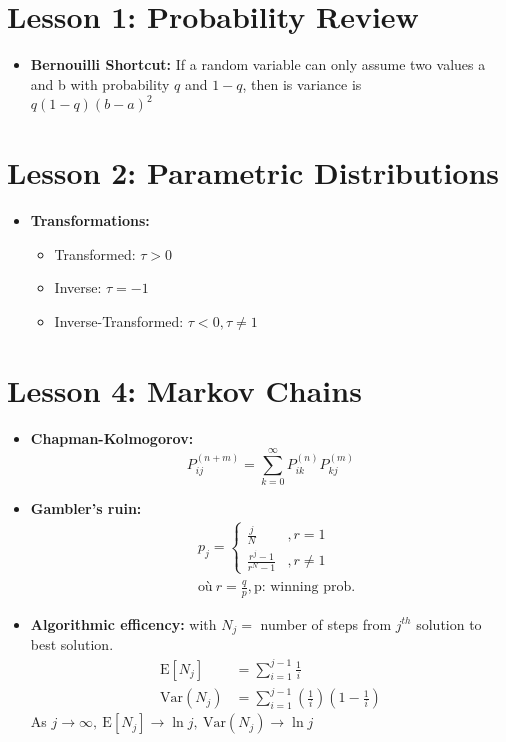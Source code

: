\documentclass[10pt, french]{article}
\begin{document}
\small
\begin{multicols*}{3} %
\def\SectionColor{magenta!80!white}
\section*{Lesson 1: Probability Review}
\begin{itemize}[align=left,leftmargin=*]
    \item \textbf{Bernouilli Shortcut:} If a random variable can only assume two values a and b with probability $q$ and $1-q$, then is variance is \\ $q(1-q)(b-a)^2$
\end{itemize}

\section*{Lesson 2: Parametric Distributions}
\begin{itemize}[align=left,leftmargin=*]
    \item \textbf{Transformations:}
    \begin{itemize}
        \item Transformed: $\tau > 0$
        \item Inverse: $\tau = -1$
        \item Inverse-Transformed: $\tau < 0, \tau \neq 1$
    \end{itemize}
\end{itemize}

\def\SectionColor{brown!80!white}
\section*{Lesson 4: Markov Chains}
\begin{itemize}[align=left,leftmargin=*]
    \item \textbf{Chapman-Kolmogorov:} \[ P_{ij}^{(n+m)} = \sum_{k=0}^\infty P_{ik}^{(n)}  P_{kj}^{(m)} \]
    \item \textbf{Gambler's ruin:}
    \begin{align*}
        &p_j=
        \left\{
        \begin{array}{cc}
        \frac{j}{N} & ,r=1  \\
        \frac{r^j-1}{r^N-1} & ,r \neq 1
        \end{array}
        \right. \\
        & \text{où}\: r = \frac{q}{p}, \text{p: winning prob.}
    \end{align*}
    \item \textbf{Algorithmic efficency:} with $N_j=$ number of steps from $j^{th}$ solution to best solution.
    \begin{align*}
        \mathrm{E}[N_j] &= \sum_{i=1}^{j-1} \frac{1}{i} \\
        \text{Var}(N_j) &= \sum_{i=1}^{j-1} \left( \frac{1}{i} \right) \left(1 -  \frac{1}{i} \right)
    \end{align*}
    As $j \rightarrow \infty,\: \mathrm{E}[N_j] \rightarrow \ln j,\: \text{Var}(N_j) \rightarrow \ln j$
\end{itemize}


\end{multicols*}
\end{document}
